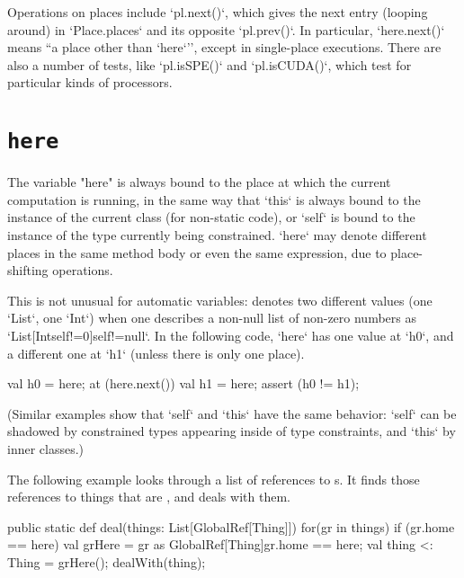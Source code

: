 Operations on places include \xcd`pl.next()`, which gives the next entry
(looping around) in \xcd`Place.places` and its opposite \xcd`pl.prev()`. In
particular, \xcd`here.next()` means ``a place other than \xcd`here`'', except
in single-place executions.
There are also a number of tests, like \xcd`pl.isSPE()` and 
\xcd`pl.isCUDA()`, which test for particular kinds of processors.




\section{{\tt here}}\label{Here}

The variable \xcd"here" is always bound to the place at which the current
computation is running, in the same way that \xcd`this` is always bound to the
instance of the current class (for non-static code), or \xcd`self` is bound to
the instance of the type currently being constrained.  
\xcd`here` may denote different places in the same method body or even the
same expression, due to
place-shifting operations.


This is not unusual for automatic variables:   denotes 
two different values (one \xcd`List`, one \xcd`Int`) 
when one describes a non-null list of non-zero numbers as
\xcd`List[Int{self!=0}]{self!=null}`. In the following 
code, \xcd`here` has one value at 
\xcd`h0`, and a different one at \xcd`h1` (unless there is only one place).
\begin{xten}
val h0 = here;
at (here.next()) {
  val h1 = here; 
  assert (h0 != h1);
}
\end{xten}
\noindent
(Similar examples show that \xcd`self` and \xcd`this` have the same behavior:
\xcd`self` can be shadowed by constrained types appearing inside of type
constraints, and \xcd`this` by inner classes.)



The following example looks through a list of references to s.  
It finds those references to things that are , and deals with them.  
\begin{xten}
  public static def deal(things: List[GlobalRef[Thing]]) {
     for(gr in things) {
        if (gr.home == here) {
           val grHere = 
               gr as GlobalRef[Thing]{gr.home == here};
           val thing <: Thing = grHere();
           dealWith(thing);
        }
     }
  }
\end{xten}


